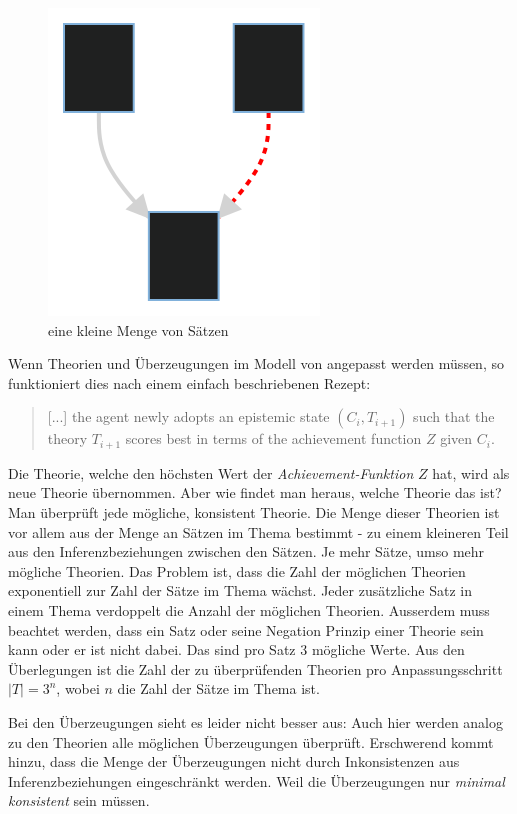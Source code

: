 \documentclass{article}
\begin{document}
\begin{figure}[h]
  \centering
  \includegraphics{figure1}
  \caption{eine kleine Menge von Sätzen\label{fig:smallset}}
\end{figure}

Wenn Theorien und Überzeugungen im Modell von \citeauthor{beisbart_making_2015} angepasst werden müssen, so funktioniert dies nach einem einfach beschriebenen Rezept:

\begin{quote}
    [...] the agent newly adopts an epistemic state $(C_i, T_{i+1})$ such that the theory $T_{i+1}$ scores best in terms of the achievement function $Z$ given $C_i$. \autocite[S.~11]{beisbart_making_2015}
\end{quote}

Die Theorie, welche den höchsten Wert der \textit{Achievement-Funktion} $Z$ hat, wird als neue Theorie übernommen. Aber wie findet man heraus, welche Theorie das ist? Man überprüft jede mögliche, konsistent Theorie. Die Menge dieser Theorien ist vor allem aus der Menge an Sätzen im Thema bestimmt - zu einem kleineren Teil aus den Inferenzbeziehungen zwischen den Sätzen. Je mehr Sätze, umso mehr mögliche Theorien. Das Problem ist, dass die Zahl der möglichen Theorien exponentiell zur Zahl der Sätze im Thema wächst. Jeder zusätzliche Satz in einem Thema verdoppelt die Anzahl der möglichen Theorien. Ausserdem muss beachtet werden, dass ein Satz oder seine Negation Prinzip einer Theorie sein kann oder er ist nicht dabei. Das sind pro Satz 3 mögliche Werte. Aus den Überlegungen ist die Zahl der zu überprüfenden Theorien pro Anpassungsschritt $\lvert T \rvert = 3^n$, wobei $n$ die Zahl der Sätze im Thema ist.

Bei den Überzeugungen sieht es leider nicht besser aus: Auch hier werden analog zu den Theorien alle möglichen Überzeugungen überprüft. Erschwerend kommt hinzu, dass die Menge der Überzeugungen nicht durch Inkonsistenzen aus Inferenzbeziehungen eingeschränkt werden. Weil die Überzeugungen nur \textit{minimal konsistent} sein müssen.
\end{document}
